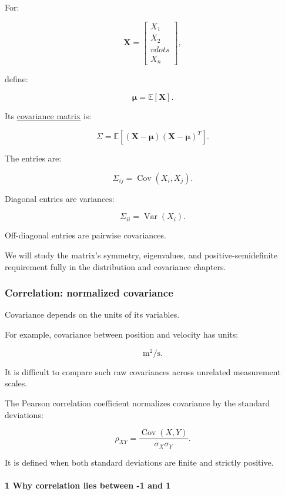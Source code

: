 For:

\[
 \mathbf X= \begin{bmatrix}X_1\\X_2\\vdots\\X_n\end{bmatrix},
\]

define:

\[
 \boldsymbol\mu=\mathbb E[\mathbf X].
\]

Its \hyperref[02-foundations-ii-ch023]{covariance matrix} is:

\[
 \boxed{ \Sigma= \mathbb E[ (\mathbf X-\boldsymbol\mu) (\mathbf X-\boldsymbol\mu)^T ] }.
\]

The entries are:

\[
 \Sigma_{ij}=\operatorname{Cov}(X_i,X_j).
\]

Diagonal entries are variances:

\[
 \Sigma_{ii}=\operatorname{Var}(X_i).
\]

Off-diagonal entries are pairwise covariances.

We will study the matrix's symmetry, eigenvalues, and positive-semidefinite requirement fully in the distribution and covariance chapters.

\subsubsection{Correlation: normalized covariance}\label{correlation-normalized-covariance}

Covariance depends on the units of its variables.

For example, covariance between position and velocity has units:

\[
 \mathrm{m^2/s}.
\]

It is difficult to compare such raw covariances across unrelated measurement scales.

The Pearson correlation coefficient normalizes covariance by the standard deviations:

\[
 \boxed{ \rho_{XY}= \frac{ \operatorname{Cov}(X,Y) }{ \sigma_X\sigma_Y } }.
\]

It is defined when both standard deviations are finite and strictly positive.

\paragraph{1 Why correlation lies between -1 and 1}\label{why-correlation-lies-between--1-and-1}

